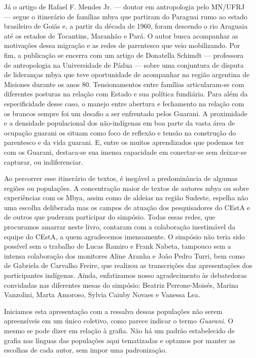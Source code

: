 Já o artigo de Rafael F. Mendes Jr. --- doutor em antropologia pelo
MN/UFRJ --- segue o itinerário de famílias mbya que partiram do Paraguai
rumo ao estado brasileiro de Goiás e, a partir da década de 1960, foram
descendo o rio Araguaia até os estados de Tocantins, Maranhão e Pará. O
autor busca acompanhar as motivações dessa migração e as redes de
parentesco que veio mobilizando. Por fim, a publicação se encerra com um
artigo de Donatella Schimdt --- professora de antropologia na
Universidade de Pádua --- sobre uma conjuntura de disputa de lideranças
mbya que teve oportunidade de acompanhar na região argentina de Misiones
durante os anos 80. Tensionamentos entre famílias articularam-se com
diferentes posturas na relação com Estado e sua política fundiária. Para
além da especificidade desse caso, o manejo entre abertura e fechamento
na relação com os brancos sempre foi um desafio a ser enfrentado pelos
Guarani. A proximidade e a densidade populacional dos não-indígenas em
boa parte da vasta área de ocupação guarani os situam como foco de
reflexão e tensão na construção do parentesco e da vida guarani. E,
entre os muitos aprendizados que podemos ter com os Guarani, destaca-se
sua imensa capacidade em conectar-se sem deixar-se capturar, ou
indiferenciar.

Ao percorrer esse itinerário de textos, é inegável a predominância de
algumas regiões ou populações. A concentração maior de textos de autores
mbya ou sobre experiências com os Mbya, assim como de aldeias na região
Sudeste, espelha não uma escolha deliberada mas os campos de atuação dos
pesquisadores do CEstA e de outros que puderam participar do simpósio.
Todas essas redes, que procuramos amarrar neste livro, contaram com a
colaboração inestimável da equipe do CEstA, a quem agradecemos
imensamente. O simpósio não teria sido possível sem o trabalho de Lucas
Ramiro e Frank Nabeta, tampouco sem a intensa colaboração dos monitores
Aline Aranha e João Pedro Turri, bem como de Gabriela de Carvalho
Freire, que realizou as transcrições das apresentações dos participantes
indígenas. Ainda, enfatizamos nosso agradecimento às debatedoras
convidadas nas diferentes mesas do simpósio: Beatriz Perrone-Moisés,
Marina Vanzolini, Marta Amoroso, Sylvia Caiuby Novaes e Vanessa Lea.

Iniciamos esta apresentação com a ressalva dessas populações não serem
apreensíveis em um único coletivo, como parece indicar o termo
\emph{Guarani}. O mesmo se pode dizer em relação à grafia. Não há um
padrão estabelecido de grafia nas línguas das populações aqui
tematizadas e optamos por manter as escolhas de cada autor, sem impor
uma padronização.

